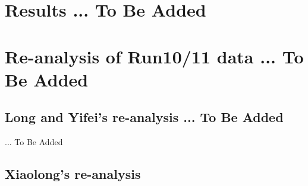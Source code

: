 \documentclass[a4paper]{article}
\begin{document}
\section{\label{results}Results ... To Be Added}

\section{\label{Run1011}Re-analysis of Run10/11 data ... To Be Added}

\subsection{Long and Yifei's re-analysis ... To Be Added}

... To Be Added

\subsection{Xiaolong's re-analysis}




\clearpage


% 
\end{document}
